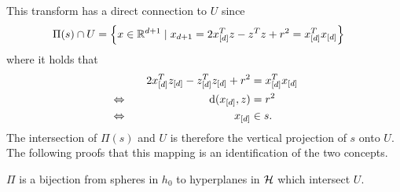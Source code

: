 This transform has a direct connection to $U$ since
\begin{align}
    \Pi(s) \cap U &= \left\{ x \in \mathbb{R}^{d+1} \mid x_{d+1} = 2x_{[d]}^Tz - z^Tz + r^2 = x_{[d]}^Tx_{[d]} \right\}
\end{align}
where it holds that
\begin{alignat}{2}
    &&2x_{[d]}^Tz_{[d]} - z_{[d]}^Tz_{[d]} + r^2 &= x_{[d]}^Tx_{[d]}\\
    &\Leftrightarrow\quad& \operatorname{d}(x_{[d]}, z) &= r^2\\
    &\Leftrightarrow\quad& x_{[d]} &\in s.
\end{alignat}
The intersection of $\Pi(s)$ and $U$ is therefore the vertical projection of $s$ onto $U$.
The following proofs that this mapping is an identification of the two concepts.
\begin{lemma}
    \label{lem:pibijection}
    $\Pi$ is a bijection from spheres in $h_0$ to hyperplanes in $\mathcal{H}$ which intersect $U$.
\end{lemma}
